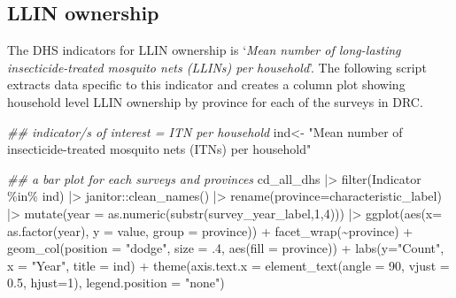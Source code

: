 \documentclass[
  letterpaper,
  DIV=11,
  numbers=noendperiod]{scrreprt}
\newenvironment{Shaded}{\begin{snugshade}}{\end{snugshade}}
\newcommand{\AttributeTok}[1]{\textcolor[rgb]{0.40,0.45,0.13}{#1}}
\newcommand{\DecValTok}[1]{\textcolor[rgb]{0.68,0.00,0.00}{#1}}
\newcommand{\DocumentationTok}[1]{\textcolor[rgb]{0.37,0.37,0.37}{\textit{#1}}}
\newcommand{\FloatTok}[1]{\textcolor[rgb]{0.68,0.00,0.00}{#1}}
\newcommand{\FunctionTok}[1]{\textcolor[rgb]{0.28,0.35,0.67}{#1}}
\newcommand{\NormalTok}[1]{\textcolor[rgb]{0.00,0.23,0.31}{#1}}
\newcommand{\OtherTok}[1]{\textcolor[rgb]{0.00,0.23,0.31}{#1}}
\newcommand{\SpecialCharTok}[1]{\textcolor[rgb]{0.37,0.37,0.37}{#1}}
\newcommand{\StringTok}[1]{\textcolor[rgb]{0.13,0.47,0.30}{#1}}
\begin{document}
\subsection{LLIN ownership}\label{llin-ownership}

The DHS indicators for LLIN ownership is `\emph{Mean number of
long-lasting insecticide-treated mosquito nets (LLINs) per household}'.
The following script extracts data specific to this indicator and
creates a column plot showing household level LLIN ownership by province
for each of the surveys in DRC.

\begin{Shaded}
\begin{Highlighting}[]
\DocumentationTok{\#\# indicator/s of interest = ITN per household}
\NormalTok{ind}\OtherTok{\textless{}{-}} \StringTok{"Mean number of insecticide{-}treated mosquito nets (ITNs) per household"}
 
\DocumentationTok{\#\# a bar plot for each surveys and provinces}
\NormalTok{cd\_all\_dhs }\SpecialCharTok{|\textgreater{}}
  \FunctionTok{filter}\NormalTok{(Indicator }\SpecialCharTok{\%in\%}\NormalTok{ ind) }\SpecialCharTok{|\textgreater{}}
\NormalTok{  janitor}\SpecialCharTok{::}\FunctionTok{clean\_names}\NormalTok{() }\SpecialCharTok{|\textgreater{}}  
  \FunctionTok{rename}\NormalTok{(}\AttributeTok{province=}\NormalTok{characteristic\_label) }\SpecialCharTok{|\textgreater{}}
  \FunctionTok{mutate}\NormalTok{(}\AttributeTok{year =} \FunctionTok{as.numeric}\NormalTok{(}\FunctionTok{substr}\NormalTok{(survey\_year\_label,}\DecValTok{1}\NormalTok{,}\DecValTok{4}\NormalTok{))) }\SpecialCharTok{|\textgreater{}}
  \FunctionTok{ggplot}\NormalTok{(}\FunctionTok{aes}\NormalTok{(}\AttributeTok{x=} \FunctionTok{as.factor}\NormalTok{(year), }\AttributeTok{y =}\NormalTok{ value, }\AttributeTok{group =}\NormalTok{ province)) }\SpecialCharTok{+}
  \FunctionTok{facet\_wrap}\NormalTok{(}\SpecialCharTok{\textasciitilde{}}\NormalTok{province) }\SpecialCharTok{+}
  \FunctionTok{geom\_col}\NormalTok{(}\AttributeTok{position =} \StringTok{"dodge"}\NormalTok{, }\AttributeTok{size =}\NormalTok{ .}\DecValTok{4}\NormalTok{, }\FunctionTok{aes}\NormalTok{(}\AttributeTok{fill =}\NormalTok{ province)) }\SpecialCharTok{+}
  \FunctionTok{labs}\NormalTok{(}\AttributeTok{y=}\StringTok{"Count"}\NormalTok{, }\AttributeTok{x =} \StringTok{"Year"}\NormalTok{,}
       \AttributeTok{title =}\NormalTok{ ind) }\SpecialCharTok{+}
  \FunctionTok{theme}\NormalTok{(}\AttributeTok{axis.text.x =} \FunctionTok{element\_text}\NormalTok{(}\AttributeTok{angle =} \DecValTok{90}\NormalTok{, }\AttributeTok{vjust =} \FloatTok{0.5}\NormalTok{, }\AttributeTok{hjust=}\DecValTok{1}\NormalTok{),}
        \AttributeTok{legend.position =} \StringTok{"none"}\NormalTok{)}
\end{Highlighting}
\end{Shaded}
\end{document}
